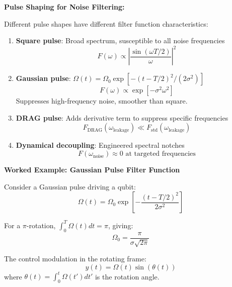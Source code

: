 \documentclass[11pt,a4paper]{article}
\theoremstyle{definition}
\theoremstyle{remark}
\begin{document}
\textbf{Pulse Shaping for Noise Filtering:}

Different pulse shapes have different filter function characteristics:

\begin{enumerate}
    \item \textbf{Square pulse}: Broad spectrum, susceptible to all noise frequencies
    \begin{equation}
    F(\omega) \propto \left|\frac{\sin(\omega T/2)}{\omega}\right|^2
    \end{equation}

    \item \textbf{Gaussian pulse}: $\Omega(t) = \Omega_0 \exp[-(t-T/2)^2/(2\sigma^2)]$
    \begin{equation}
    F(\omega) \propto \exp[-\sigma^2\omega^2]
    \end{equation}
    Suppresses high-frequency noise, smoother than square.

    \item \textbf{DRAG pulse}: Adds derivative term to suppress specific frequencies
    \begin{equation}
    F_{\text{DRAG}}(\omega_{\text{leakage}}) \ll F_{\text{std}}(\omega_{\text{leakage}})
    \end{equation}

    \item \textbf{Dynamical decoupling}: Engineered spectral notches
    \begin{equation}
    F(\omega_{\text{noise}}) \approx 0 \text{ at targeted frequencies}
    \end{equation}
\end{enumerate}

\textbf{Worked Example: Gaussian Pulse Filter Function}

Consider a Gaussian pulse driving a qubit:
\begin{equation}
\Omega(t) = \Omega_0 \exp\left[-\frac{(t-T/2)^2}{2\sigma^2}\right]
\end{equation}

For a $\pi$-rotation, $\int_0^T \Omega(t)dt = \pi$, giving:
\begin{equation}
\Omega_0 = \frac{\pi}{\sigma\sqrt{2\pi}}
\end{equation}

The control modulation in the rotating frame:
\begin{equation}
y(t) = \Omega(t)\sin(\theta(t))
\end{equation}
where $\theta(t) = \int_0^t \Omega(t')dt'$ is the rotation angle.
\end{document}
